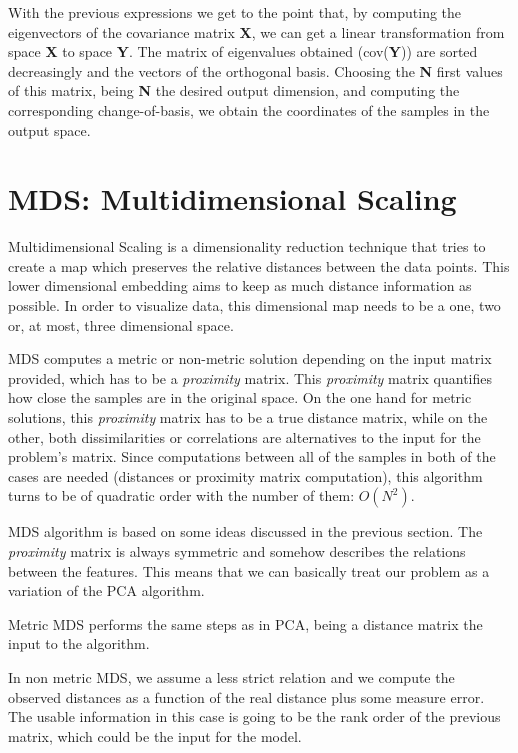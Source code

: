 \documentclass[a4paper,11pt,spanish]{report}
\begin{document}
With the previous expressions we get to the point that, by computing the eigenvectors of the covariance matrix \textbf{X}, we can get a linear transformation from space \textbf{X} to space \textbf{Y}. The matrix of eigenvalues obtained (cov(\textbf{Y})) are sorted decreasingly and the vectors of the orthogonal basis. Choosing the \textbf{N} first values of this matrix, being \textbf{N} the desired output dimension, and computing the corresponding change-of-basis, we obtain the coordinates of the samples in the output space.

\section{MDS: Multidimensional Scaling}
\label{sec:mds}

Multidimensional Scaling \citep{mds} is a dimensionality reduction technique that tries to create a map which preserves the relative distances between the data points. This lower dimensional embedding aims to keep as much distance information as possible. In order to visualize data, this dimensional map needs to be a one, two or, at most, three dimensional space.

MDS computes a metric or non-metric solution depending on the input matrix provided, which has to be a \textit{proximity} matrix. This \textit{proximity} matrix quantifies how close the samples are in the original space. On the one hand for metric solutions, this \textit{proximity} matrix has to be a true distance matrix, while on the other, both dissimilarities or correlations are alternatives to the input for the problem's matrix. Since computations between all of the samples in both of the cases are needed (distances or proximity matrix computation), this algorithm turns to be of  quadratic order with the number of them: $O(N^{2})$.

MDS algorithm is based on some ideas discussed in the previous section. The \textit{proximity} matrix is always  symmetric and somehow describes the relations between the features. This means that we can basically treat our problem as a variation of the PCA algorithm.

Metric MDS performs the same steps as in PCA, being a distance matrix the input to the algorithm.

In non metric MDS, we assume a less strict relation and we compute the observed distances as a function of the real distance plus some measure error. The usable information in this case is going to be the rank order of the previous matrix, which could be the input for the model.
\end{document}
